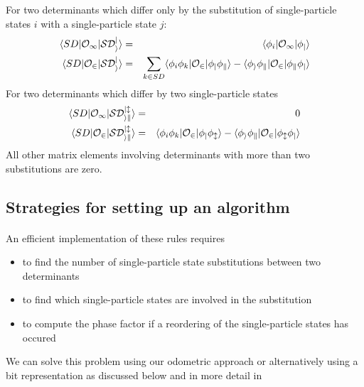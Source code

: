 For two determinants which differ only by the substitution of single-particle states $i$ with
a single-particle state $j$:
\begin{eqnarray}
  \langle SD | \cal{O}_1 | SD_i^j \rangle & = & \langle \phi_i | \cal{O}_1 | \phi_j \rangle \\
  \langle SD | \cal{O}_2 | SD_i^j \rangle & = & \sum_{k \in SD} 
      \langle \phi_i \phi_k | \cal{O}_2 | \phi_j \phi_k \rangle - 
      \langle \phi_i \phi_k | \cal{O}_2 | \phi_k \phi_j \rangle \nonumber
\end{eqnarray}
For two determinants which differ by two single-particle states
\begin{eqnarray}
  \langle SD | \cal{O}_1 | SD_{ik}^{jl} \rangle & = & 0 \\
  \langle SD | \cal{O}_2 | SD_{ik}^{jl} \rangle & = & 
      \langle \phi_i \phi_k | \cal{O}_2 | \phi_j \phi_l \rangle -
      \langle \phi_i \phi_k | \cal{O}_2 | \phi_l \phi_j \rangle \nonumber 
\end{eqnarray}
All other matrix elements involving determinants with more than two
substitutions are zero.



\subsection*{Strategies for setting up an algorithm}

\paragraph{}

An efficient implementation of these rules requires

\begin{itemize}
\item to find the number of single-particle state substitutions between two determinants

\item to find which single-particle states are involved in the substitution

\item to compute the phase factor if a reordering of the single-particle states has occured
\end{itemize}

\noindent
We can solve this problem using our odometric approach or alternatively using a bit representation as discussed below and in more detail in 

